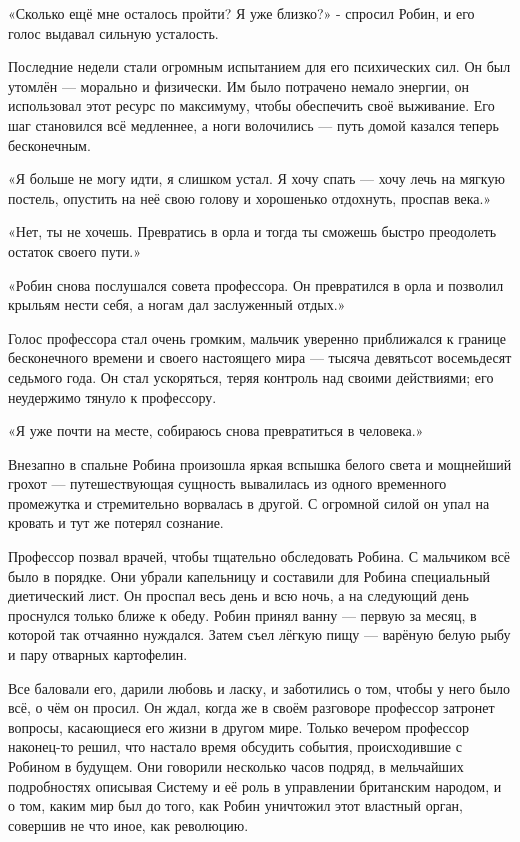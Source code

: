 \documentclass[a4paper,12pt]{book}
\begin{document}
\par
«Сколько ещё мне осталось пройти? Я уже близко?» - спросил Робин, и его голос выдавал сильную усталость.
\par
Последние недели стали огромным испытанием для его психических сил. Он был утомлён — морально и физически. Им было потрачено немало энергии, он использовал этот ресурс по максимуму, чтобы обеспечить своё выживание. Его шаг становился всё медленнее, а ноги волочились — путь домой казался теперь бесконечным.
\par
«Я больше не могу идти, я слишком устал. Я хочу спать — хочу лечь на мягкую постель, опустить на неё свою голову и хорошенько отдохнуть, проспав века.»
\par
«Нет, ты не хочешь. Превратись в орла и тогда ты сможешь быстро преодолеть остаток своего пути.» 
\par
«Робин снова послушался совета профессора. Он превратился в орла и позволил крыльям нести себя, а ногам дал заслуженный отдых.»
\par
Голос профессора стал очень громким, мальчик уверенно приближался к границе бесконечного времени и своего настоящего мира — тысяча девятьсот восемьдесят седьмого года. Он стал ускоряться, теряя контроль над своими действиями; его неудержимо тянуло к профессору.
\par
«Я уже почти на месте, собираюсь снова превратиться в человека.»
\par
Внезапно в спальне Робина произошла яркая вспышка белого света и мощнейший грохот — путешествующая сущность вывалилась из одного временного промежутка и стремительно ворвалась в другой. С огромной силой он упал на кровать и тут же потерял сознание.\\
\par
Профессор позвал врачей, чтобы тщательно обследовать Робина. С мальчиком всё было в порядке. Они убрали капельницу и составили для Робина специальный диетический лист. Он проспал весь день и всю ночь, а на следующий день проснулся только ближе к обеду. Робин принял ванну — первую за месяц, в которой так отчаянно нуждался. Затем съел лёгкую пищу — варёную белую рыбу и пару отварных картофелин.
\par
Все баловали его, дарили любовь и ласку, и заботились о том, чтобы у него было всё, о чём он просил. Он ждал, когда же в своём разговоре профессор затронет вопросы, касающиеся его жизни в другом мире. Только вечером профессор наконец-то решил, что настало время обсудить события, происходившие с Робином в будущем. Они говорили несколько часов подряд, в мельчайших подробностях описывая Систему и её роль в управлении британским народом, и о том, каким мир был до того, как Робин уничтожил этот властный орган, совершив не что иное, как революцию.
\end{document}
